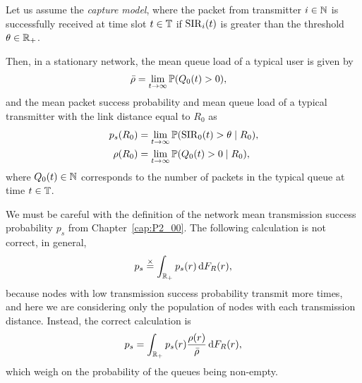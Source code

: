 Let us assume the \textit{capture model}, where the packet from transmitter $i\in\N$ is successfully received at time slot $t\in\T$ if $\SIR_i(t)$ is greater than the threshold $\theta\in\R_+$.

Then, in a stationary network, the mean queue load of a typical user is given by
\begin{align}
    \bar\rho &= \lim_{t\to\infty} \P(Q_0(t)>0),
\end{align}
and the mean packet success probability and mean queue load of a typical transmitter with the link distance equal to $R_0$ as
\begin{align}
    p_s(R_0) &= \lim_{t\to\infty} \P(\SIR_0(t) > \theta \mid R_0),\\
    \rho(R_0) &= \lim_{t\to\infty} \P(Q_0(t) > 0 \mid R_0),
\end{align}
where $Q_0(t)\in\N$ corresponds to the number of packets in the typical queue at time $t\in\T$.

\begin{note}
    We must be careful with the definition of the network mean transmission success probability $p_s$ from Chapter~\ref{cap:P2_00}. The following calculation is not correct, in general,
    \begin{align*}
        p_s \stackrel{\times}{=} \int_{\R_+} p_s(r)\,\d F_R(r),
    \end{align*}
    because nodes with low transmission success probability transmit more times, and here we are considering only the population of nodes with each transmission distance. Instead, the correct calculation is
    \begin{align*}
        p_s = \int_{\R_+} p_s(r) \frac{\rho(r)}{\bar\rho} \,\d F_R(r),
    \end{align*}
    which weigh on the probability of the queues being non-empty.
\end{note}



